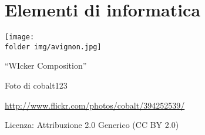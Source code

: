 \part{Elementi di informatica}
\texttt{[image: \\folder img/avignon.jpg]}
  \begin{center}
    {\large ``WIcker Composition''}\par
    Foto di cobalt123\par
    \url{http://www.flickr.com/photos/cobalt/394252539/}\par
    Licenza: Attribuzione 2.0 Generico (CC BY 2.0)\par
  \end{center}
\clearpage
\cleardoublepage